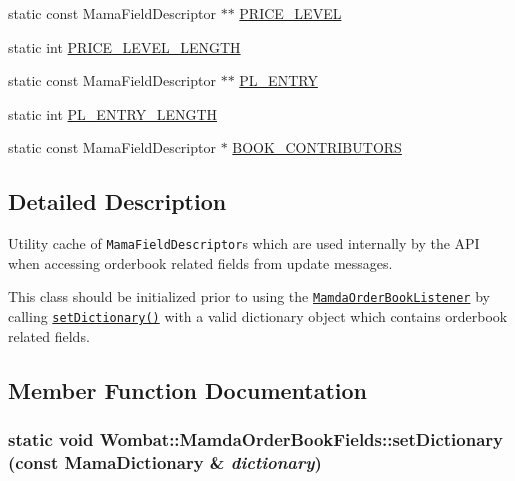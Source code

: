 \begin{CompactItemize}
\item 
static const Mama\-Field\-Descriptor $\ast$$\ast$ \hyperlink{classWombat_1_1MamdaOrderBookFields_e6d95a7d462349a2ebccb2d935fbb4de}{PRICE\_\-LEVEL}
\item 
static int \hyperlink{classWombat_1_1MamdaOrderBookFields_51723ea73bbad34192da9acb662806c2}{PRICE\_\-LEVEL\_\-LENGTH}
\item 
static const Mama\-Field\-Descriptor $\ast$$\ast$ \hyperlink{classWombat_1_1MamdaOrderBookFields_4e16493f242368a418ebf0d0edcee951}{PL\_\-ENTRY}
\item 
static int \hyperlink{classWombat_1_1MamdaOrderBookFields_314afa702237567d3d7e2e80df3a2f93}{PL\_\-ENTRY\_\-LENGTH}
\item 
static const Mama\-Field\-Descriptor $\ast$ \hyperlink{classWombat_1_1MamdaOrderBookFields_2a39ae0dbfa7955d4ecdd204234d75d2}{BOOK\_\-CONTRIBUTORS}
\end{CompactItemize}


\subsection{Detailed Description}
Utility cache of {\tt Mama\-Field\-Descriptor}s which are used internally by the API when accessing orderbook related fields from update messages. 

This class should be initialized prior to using the {\tt \hyperlink{classWombat_1_1MamdaOrderBookListener}{Mamda\-Order\-Book\-Listener}} by calling {\tt \hyperlink{classWombat_1_1MamdaOrderBookFields_3d622bb24f97096258fc46622e586245}{set\-Dictionary()}} with a valid dictionary object which contains orderbook related fields. 



\subsection{Member Function Documentation}
\hypertarget{classWombat_1_1MamdaOrderBookFields_3d622bb24f97096258fc46622e586245}{
\subsubsection[setDictionary]{\setlength{\rightskip}{0pt plus 5cm}static void Wombat::Mamda\-Order\-Book\-Fields::set\-Dictionary (const Mama\-Dictionary \& {\em dictionary})}}
\label{classWombat_1_1MamdaOrderBookFields_3d622bb24f97096258fc46622e586245}


